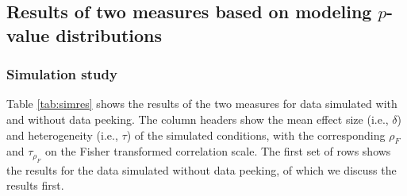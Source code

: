 \documentclass[a5paper]{book}
\begin{document}
\subsection{\texorpdfstring{Results of two measures based on modeling
\(p\)-value
distributions}{Results of two measures based on modeling p-value distributions}}\label{results-of-two-measures-based-on-modeling-p-value-distributions}

\subsubsection{Simulation study}\label{simulation-study}

Table \ref{tab:simres} shows the results of the two measures for data
simulated with and without data peeking. The column headers show the
mean effect size (i.e., \(\delta\)) and heterogeneity (i.e., \(\tau\))
of the simulated conditions, with the corresponding \(\rho_F\) and
\(\tau_{\rho_F}\) on the Fisher transformed correlation scale. The first
set of rows shows the results for the data simulated without data
peeking, of which we discuss the results first.
\end{document}
